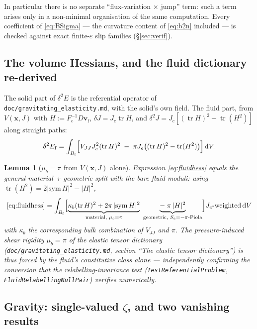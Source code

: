 \documentclass[11pt]{article}
\newtheorem{lemma}{Lemma}
\newcommand{\eps}{\varepsilon}
\newcommand{\Bf}{B_{\mathrm{f}}}
\newcommand{\bv}{\mathbf{v}}
\newcommand{\bx}{\mathbf{x}}
\newcommand{\dV}{\,\mathrm{d}V}
\newcommand{\tr}{\operatorname{tr}}
\begin{document}
In particular there is no separate ``flux-variation $\times$ jump''
term: such a term arises only in a non-minimal organisation of the
same computation. Every coefficient of \eqref{eq:BSigma} --- the
curvature content of \eqref{eq:b2n} included --- is checked against
exact finite-$\eps$ slip families (\S\ref{sec:verif}).

\subsection{The volume Hessians, and the fluid dictionary re-derived}

The solid part of $\delta^2 E$ is the referential operator of
\texttt{doc/gravitating\_elasticity.md}, with the solid's own field. The fluid part, from $V(\bx, J)$ with
$H := F_e^{-1} D\bv_{\mathrm{f}}$, $\delta J = J_e \tr H$, and
$\delta^2 J = J_e[(\tr H)^2 - \tr(H^2)]$ along straight paths:
\begin{equation}
  \delta^2 E_{\mathrm{f}}
  = \int_{\Bf} \Bigl[ V_{JJ} J_e^2 (\tr H)^2
    \;-\; \pi J_e \bigl( (\tr H)^2 - \tr(H^2) \bigr) \Bigr] \dV .
  \label{eq:fluidhess}
\end{equation}

\begin{lemma}[$\mu_b = \pi$ from $V(\bx,J)$ alone]\label{lem:mub}
Expression \eqref{eq:fluidhess} equals the general material +
geometric split with the \emph{bare} fluid moduli: using
$\tr(H^2) = 2|\mathrm{sym}\,H|^2 - |H|^2$,
\[
  \eqref{eq:fluidhess}
  = \int_{\Bf} \Bigl[ \underbrace{\kappa_b (\tr H)^2
      + 2\pi\,|\mathrm{sym}\,H|^2}_{\text{material, } \mu_b = \pi}
      \;\underbrace{-\;\pi\,|H|^2}_{\text{geometric, } S_e = -\pi
      \text{-Piola}} \Bigr] J_e\text{-weighted} \dV
\]
with $\kappa_b$ the corresponding bulk combination of $V_{JJ}$ and
$\pi$. The pressure-induced shear rigidity $\mu_b = \pi$ of the elastic
tensor dictionary (\texttt{doc/gravitating\_elasticity.md}, section
``The elastic tensor dictionary'') is thus forced by the fluid's
constitutive class alone --- independently confirming the conversion
that the relabelling-invariance test
(\texttt{TestReferentialProblem}, \texttt{FluidRelabellingNullPair})
verifies numerically.
\end{lemma}

\subsection{\texorpdfstring{Gravity: single-valued $\zeta$, and two vanishing results}{Gravity: single-valued zeta, and two vanishing results}}
\label{sec:grav}
\end{document}

